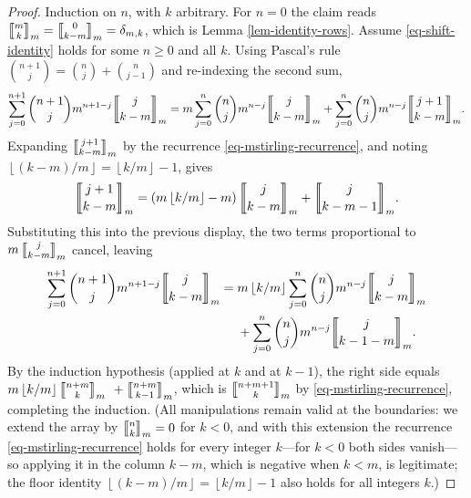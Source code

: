 \documentclass[a4paper]{amsart}
\numberwithin{equation}{section}
\newcommand{\mStirling}[0]{\genfrac{\llbracket}{\rrbracket}{0pt}{}}
\newcommand{\floor}[1]{\left\lfloor #1 \right\rfloor}
\begin{document}
\begin{proof}
Induction on $n$, with $k$ arbitrary. For $n = 0$ the claim reads $\mStirling{m}{k}_m = \mStirling{0}{k-m}_m = \delta_{m,k}$, which is Lemma \ref{lem-identity-rows}. Assume \eqref{eq-shift-identity} holds for some $n \geq 0$ and all $k$. Using Pascal's rule $\binom{n+1}{j} = \binom{n}{j} + \binom{n}{j-1}$ and re-indexing the second sum,
\[
\sum_{j=0}^{n+1}\binom{n+1}{j}m^{n+1-j}\mStirling{j}{k-m}_m
= m\sum_{j=0}^{n}\binom{n}{j}m^{n-j}\mStirling{j}{k-m}_m + \sum_{j=0}^{n}\binom{n}{j}m^{n-j}\mStirling{j+1}{k-m}_m.
\]
Expanding $\mStirling{j+1}{k-m}_m$ by the recurrence \eqref{eq-mstirling-recurrence}, and noting $\floor{(k-m)/m} = \floor{k/m} - 1$, gives
\[
\mStirling{j+1}{k-m}_m = \left(m\floor{k/m} - m\right)\mStirling{j}{k-m}_m + \mStirling{j}{k-m-1}_m.
\]
Substituting this into the previous display, the two terms proportional to $m\,\mStirling{j}{k-m}_m$ cancel, leaving
\[
\begin{aligned}
\sum_{j=0}^{n+1}\binom{n+1}{j}m^{n+1-j}\mStirling{j}{k-m}_m
={}& m\floor{k/m} \sum_{j=0}^{n}\binom{n}{j}m^{n-j}\mStirling{j}{k-m}_m \\
&+ \sum_{j=0}^{n}\binom{n}{j}m^{n-j}\mStirling{j}{k-1-m}_m.
\end{aligned}
\]
By the induction hypothesis (applied at $k$ and at $k-1$), the right side equals $m\floor{k/m}\mStirling{n+m}{k}_m$ ${}+ \mStirling{n+m}{k-1}_m$, which is $\mStirling{n+m+1}{k}_m$ by \eqref{eq-mstirling-recurrence}, completing the induction. (All manipulations remain valid at the boundaries: we extend the array by $\mStirling{n}{k}_m = 0$ for $k < 0$, and with this extension the recurrence \eqref{eq-mstirling-recurrence} holds for every integer $k$---for $k < 0$ both sides vanish---so applying it in the column $k-m$, which is negative when $k < m$, is legitimate; the floor identity $\floor{(k-m)/m} = \floor{k/m} - 1$ also holds for all integers $k$.)
\end{proof}
\end{document}
